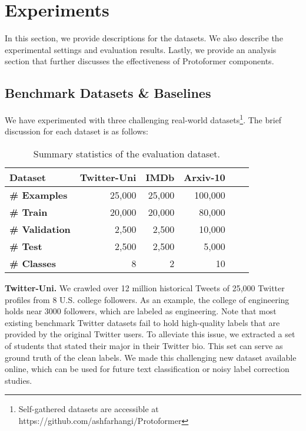 \documentclass[letterpaper]{article} \usepackage{aaai22}  \usepackage{times}  \usepackage{helvet}  \usepackage{courier}  \usepackage{amsmath,amssymb}
\begin{document}
 \section{Experiments}
\label{section-experiment}
In this section, we provide descriptions for the datasets. We also describe the experimental settings and evaluation results. Lastly, we provide an analysis section that further discusses the effectiveness of Protoformer components.

\subsection{Benchmark Datasets \& Baselines} 

We have experimented with three challenging real-world datasets\footnote{Self-gathered datasets are accessible at 
https://github.com/ashfarhangi/Protoformer}.
The brief discussion for each dataset is as follows:


\begin{table}[!h]
 \centering
 \caption{Summary statistics of the evaluation dataset.}
\begin{tabular}{l|rrrrr} 
\hline
\textbf{Dataset} & \textbf{Twitter-Uni} & \textbf{IMDb} & \textbf{Arxiv-10} \\
\hline \textbf{\# Examples} & 25,000 & 25,000 & 100,000 \\
\textbf{\# Train} & 20,000 & 20,000 & 80,000 \\
\textbf{\# Validation} & 2,500 & 2,500 & 10,000 \\
\textbf{\# Test} & 2,500 & 2,500 & 5,000 \\

\textbf{\# Classes} & 8 & 2 & 10 \\

\hline
\end{tabular}
 
 \label{tab:dataset}
\end{table}

\textbf{Twitter-Uni.} We crawled over 12 million historical Tweets of 25,000 Twitter profiles from 8 U.S. college followers. 
As an example, the college of engineering holds near 3000 followers, which are labeled as engineering. Note that most existing benchmark Twitter datasets fail to hold high-quality labels that are provided by the original Twitter users. To alleviate this issue, we extracted a set
of students that stated their major in their Twitter bio. This set can serve as ground truth of the clean labels. 
We made this challenging new dataset available online, which can be used for future text classification or noisy label correction studies.
\end{document}
